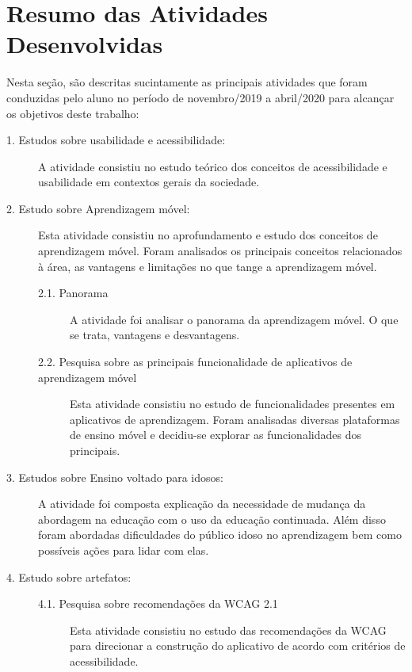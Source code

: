 \chapter{Resumo das Atividades Desenvolvidas} \label{sec:resumo_ativ}
Nesta seção, são descritas sucintamente as principais atividades que foram conduzidas pelo aluno no período de novembro/2019 a abril/2020 para alcançar os objetivos deste trabalho:

\begin{description}
\item[1. Estudos sobre usabilidade e acessibilidade:]
A atividade consistiu no estudo teórico dos conceitos de acessibilidade e usabilidade em contextos gerais da sociedade.

\item[2. Estudo sobre Aprendizagem móvel:] Esta atividade consistiu no aprofundamento e estudo dos conceitos de aprendizagem móvel. Foram analisados os principais conceitos relacionados à área, as vantagens e limitações no que tange a aprendizagem móvel. 

\begin{description}
    \item[2.1. Panorama]
    A atividade foi analisar o panorama da aprendizagem móvel. O que se trata, vantagens e desvantagens.
    
    \item[2.2. Pesquisa sobre as principais funcionalidade de aplicativos de aprendizagem móvel]
    Esta atividade consistiu no estudo de funcionalidades presentes em aplicativos de aprendizagem. Foram analisadas diversas plataformas de ensino móvel e decidiu-se explorar as funcionalidades dos principais.
\end{description}

\item[3. Estudos sobre Ensino voltado para idosos:]
A atividade foi composta explicação da necessidade de mudança da abordagem na educação com o uso da educação continuada. Além disso foram abordadas dificuldades do público idoso no aprendizagem bem como possíveis ações para lidar com elas.

\item[4. Estudo sobre artefatos:]
\hfill

\begin{description}
    \item[4.1. Pesquisa sobre recomendações da WCAG 2.1]
    Esta atividade consistiu no estudo das recomendações da WCAG para direcionar a construção do aplicativo de acordo com critérios de acessibilidade.
    

\end{description}
\end{description}
